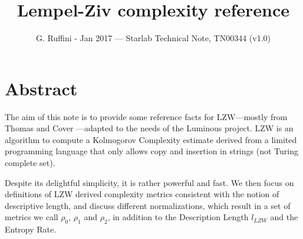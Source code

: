 \documentclass[11pt]{amsart}
\title{Lempel-Ziv complexity reference}
\author{G. Ruffini - Jan 2017 --- Starlab Technical Note, TN00344 (v1.0)}
\begin{document}

\maketitle
\tableofcontents
\section*{Abstract}
The aim of this note is to  provide some reference facts for LZW---mostly from Thomas and Cover \cite{Cover:2006aa}---adapted to the needs of the  Luminous project. LZW is an algorithm to compute a Kolmogorov Complexity estimate derived from a limited programming language that only allows copy and insertion in strings (not Turing complete set). 

Despite its delightful simplicity, it is rather powerful and fast. We then focus on definitions of LZW derived complexity metrics consistent with the notion of descriptive length, and discuss different normalizations, which result in a set of metrics we call $\rho_0$, $\rho_1$ and $\rho_2$, in addition to the Description Length $l_{LZW}$ and the Entropy Rate.

\end{document}
